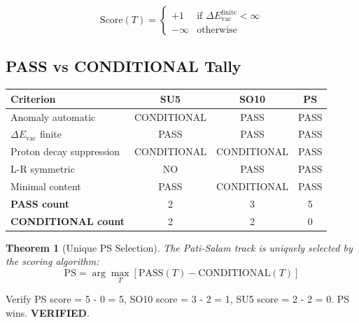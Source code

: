 \documentclass[11pt,a4paper]{article}
\newtheorem{theorem}{Theorem}[section]
\begin{document}
\begin{equation}
\label{eq:scoring-formula}
\text{Score}(T) = \begin{cases}
+1 & \text{if } \Delta E_{\text{vac}}^{\text{finite}} < \infty \\
-\infty & \text{otherwise}
\end{cases}
\end{equation}

\subsection{PASS vs CONDITIONAL Tally}
\label{subsec:pass-conditional}

\begin{center}
\begin{tabular}{lccc}
\toprule
\textbf{Criterion} & \textbf{SU5} & \textbf{SO10} & \textbf{PS} \\
\midrule
Anomaly automatic & CONDITIONAL & PASS & PASS \\
$\Delta E_{\text{vac}}$ finite & PASS & PASS & PASS \\
Proton decay suppression & CONDITIONAL & CONDITIONAL & PASS \\
L-R symmetric & NO & PASS & PASS \\
Minimal content & PASS & CONDITIONAL & PASS \\
\midrule
\textbf{PASS count} & 2 & 3 & 5 \\
\textbf{CONDITIONAL count} & 2 & 2 & 0 \\
\bottomrule
\end{tabular}
\end{center}

\begin{theorem}[Unique PS Selection]
\label{thm:ps-selection}
The Pati-Salam track is uniquely selected by the scoring algorithm:
\begin{equation}
\label{eq:ps-selected}
\boxed{\text{PS} = \arg\max_T \left[\text{PASS}(T) - \text{CONDITIONAL}(T)\right]}
\end{equation}
\end{theorem}

\begin{trapbox}
\label{trap:rt04}
Verify PS score = 5 - 0 = 5, SO10 score = 3 - 2 = 1, SU5 score = 2 - 2 = 0. PS wins. \textbf{VERIFIED}.
\end{trapbox}

\end{document}
